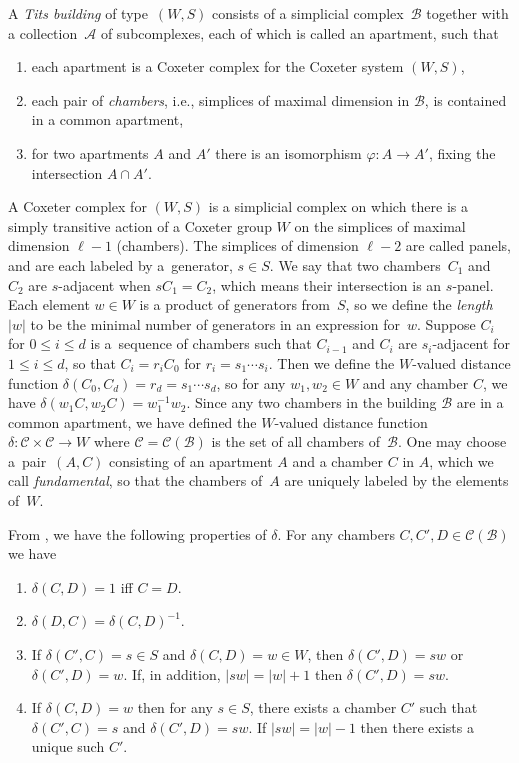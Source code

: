 \documentclass[pdftex]{sigma}
\numberwithin{equation}{section}
\def\cA{\mathcal A}
\def\cB{\mathcal B}
\def\cC{\mathcal C}
\begin{document}
\begin{Definition} \label{definition:Tits_Building}A {\em Tits building} of type~$(W,S)$ consists of a simplicial complex~$\cB$ together with a collection~$\cA$ of subcomplexes,
each of which is called an apartment, such that
\begin{enumerate}\itemsep=0pt
 \item[1)] each apartment is a Coxeter complex for the Coxeter system $(W,S)$,
 \item[2)] each pair of {\em chambers}, i.e., simplices of maximal dimension in $\cB$, is contained in a common apartment,
 \item[3)] for two apartments $A$ and $A'$ there is an isomorphism $\varphi\colon A\rightarrow A'$, fixing the intersection $A\cap A'$.
\end{enumerate}
\end{Definition}
A Coxeter complex for $(W,S)$ is a simplicial complex on which there is a simply transitive action of a Coxeter group $W$ on
the simplices of maximal dimension $\ell -1$ (chambers). The simplices of dimension $\ell -2$ are called panels, and are
each labeled by a~generator, $s\in S$. We say that two chambers~$C_1$ and~$C_2$ are $s$-adjacent when $sC_1 = C_2$, which
means their intersection is an $s$-panel. Each element $w\in W$ is a product of generators from~$S$, so we define the {\it length}~$|w|$ to be the minimal number of generators in an expression for~$w$.
Suppose $C_i$ for $0\leq i\leq d$ is a~sequence of chambers such that $C_{i-1}$ and $C_i$ are
$s_i$-adjacent for $1\leq i\leq d$, so that $C_i = r_i C_0$ for $r_i = s_1\cdots s_i$. Then we define the $W$-valued distance function $\delta(C_0,C_d) = r_d = s_1\cdots s_d$, so for any $w_1,w_2\in W$ and any chamber $C$, we have $\delta(w_1 C,w_2 C) = w_1^{-1} w_2$. Since any two chambers in the building $\cB$ are in a common apartment, we have defined the $W$-valued distance function $\delta\colon \cC\times\cC\to W$ where $\cC = \cC(\cB)$ is the set of all chambers of~$\cB$.
One may choose a~pair~$(A,C)$ consisting of an apartment $A$ and a chamber $C$ in $A$, which we call {\it fundamental}, so that the chambers of~$A$ are uniquely labeled by the elements of~$W$.

From \cite[Proposition 4.84]{AbramenkoBrown08}, we have the following properties of $\delta$. For any chambers $C,C',D\in \cC(\cB)$ we have
\begin{enumerate}\itemsep=0pt
 \item $\delta(C,D) = 1$ iff $C = D$.
 \item $\delta(D,C) = \delta(C,D)^{-1}$.
 \item If $\delta(C',C) = s\in S$ and $\delta(C,D) = w\in W$, then $\delta(C',D) = sw$ or $\delta(C',D) = w$. If, in addition,
 $|sw| = |w| + 1$ then $\delta(C',D) = sw$.
 \item If $\delta(C,D) = w$ then for any $s\in S$, there exists a chamber $C'$ such that $\delta(C',C) = s$ and $\delta(C',D) = sw$.
 If $|sw| = |w| -1$ then there exists a unique such $C'$.
\end{enumerate}
\end{document}
